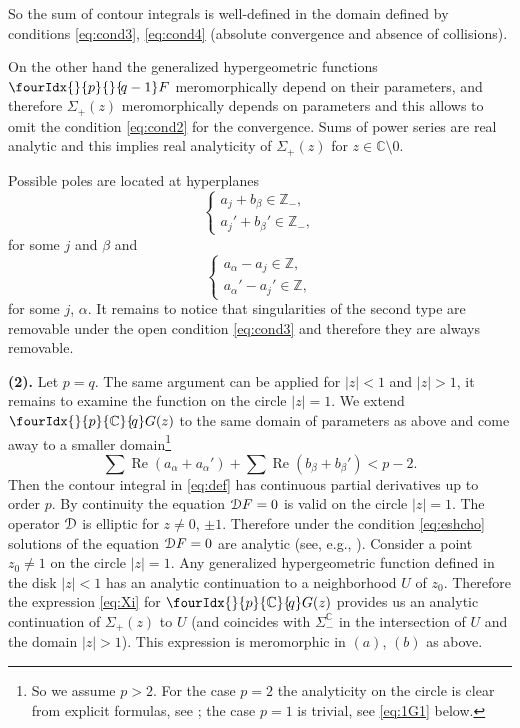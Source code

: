 \documentclass[pdftex]{sigma}
\numberwithin{equation}{section}
\renewcommand{\Re}{\mathop {\mathrm {Re}}\nolimits}
\newcommand{\hyp}[2]{\fourIdx{}{#1}{}{\!#2}F}
\newcommand{\Gc}[2]{\fourIdx{}{#1}{\C}{\!#2}G}
\renewcommand{\Re}{\mathop {\mathrm {Re}}\nolimits}
\def\C {{\mathbb C }}
\def\Z{{\mathbb Z}}
\def\cD{\EuScript D}
\begin{document}
So the sum of contour integrals is well-defined in the domain
defined by conditions \eqref{eq:cond3}, \eqref{eq:cond4}
(absolute convergence and absence of collisions).

On the other hand the generalized hypergeometric functions
$\hyp{p}{q-1}$ meromorphically depend on their parameters,
and therefore $\Sigma_+(z)$ meromorphically depends
on parameters and this allows to omit the condition \eqref{eq:cond2}
for the convergence. Sums of power series are real analytic and this implies
real analyticity of $\Sigma_+(z)$ for $z\in\C\setminus 0$.

Possible poles are located at hyperplanes
\[
\begin{cases}
a_j+b_\beta\in \Z_-,\\
a_j'+b_\beta'\in \Z_-,
\end{cases}
\]
for some $j$ and $\beta$ and
\[
\begin{cases}
a_\alpha-a_j\in \Z, \\
a_\alpha'-a_j'\in \Z,
\end{cases}
\]
for some $j$, $\alpha$.
It remains to notice that singularities of the second type are removable
under the open condition \eqref{eq:cond3} and therefore they are always
removable.

\textbf{(2).} Let $p=q$. The same argument can be applied
for $|z|< 1$ and $|z|>1$, it remains to examine the function
on the circle $|z|=1$.
We extend $\Gc{p}{q}(z)$ to the same domain of parameters as above
and come away to a smaller domain\footnote{So we assume $p>2$.
For the case $p=2$ the analyticity on the circle is clear
from explicit formulas, see \cite{MN}; the case
$p=1$ is trivial, see \eqref{eq:1G1} below.}
\begin{equation}
\sum\Re(a_\alpha+a_\alpha')+\sum\Re(b_\beta+b_\beta')< p-2.
\label{eq:eshcho}
\end{equation}
Then the contour integral in \eqref{eq:def} has continuous partial
derivatives up to order $p$.
By continuity the equation $\cD F=0$
is valid on the circle $|z|=1$.
The operator $\cD$ is elliptic for $z\ne 0$, $\pm 1$.
Therefore under the condition
\eqref{eq:eshcho} solutions of the equation $\cD F=0$ are analytic
(see, e.g., \cite[Theorem 8.5.1]{Her}).
Consider a point $z_0\ne 1$ on the circle $|z|=1$.
Any generalized hypergeometric function
defined in the disk $|z|<1$ has an analytic continuation to a
neighborhood $U$ of $z_0$.
Therefore the expression \eqref{eq:Xi} for $\Gc{p}{q}(z)$ provides us
an analytic continuation
of $\Sigma_+(z)$ to $U$ (and coincides with $\Sigma_-^\C$ in the intersection
of $U$ and the domain $|z|>1$). This expression is meromorphic in $(a)$, $(b)$ as above.
\end{document}

